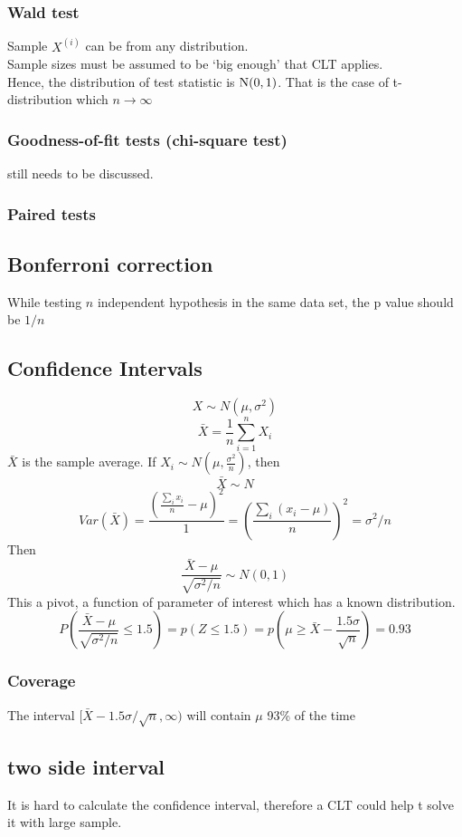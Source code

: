 \documentclass[12pt,a4paper]{article}
\begin{document}
\subsubsection*{Wald test}
Sample $X^{(i)}$ can be from any distribution.\\
Sample sizes must be assumed to be `big enough' that CLT applies.\\
Hence, the distribution of test statistic is $\rm N(0,1)$. That is the case of t-distribution which $n \rightarrow \infty$
\subsubsection*{Goodness-of-fit tests (chi-square test)}
still needs to be discussed.
\subsubsection*{Paired tests}
\subsection*{Bonferroni correction}
While testing $n$ independent hypothesis in the same data set, the p value should be $1/n$

\subsection*{Confidence Intervals}
$$
X \sim N(\mu,\sigma^2)
$$
$$
\bar X = \frac{1}{n}\sum_{i=1}^{n}X_i
$$
$\bar X$ is the sample average. If $X_i \sim N(\mu,\frac{\sigma^2}{n})$, then
$$
\bar X \sim N
$$
$$
Var(\bar X) = \frac{(\frac{\sum_ix_i}{n}-\mu)^2}{1}=(\frac{\sum_i(x_i-\mu)}{n})^2=\sigma^2/n 
$$Then
$$
\frac{\bar X-\mu}{\sqrt{\sigma^2/n}} \sim N(0,1)
$$
This a pivot, a function of parameter of interest which has a known distribution.\\
$$
P\left(\frac{\bar X-\mu}{\sqrt{\sigma^2/n}}\le 1.5\right) = p(Z\le 1.5)=p\left(\mu\ge \bar X-\frac{1.5\sigma}{\sqrt n}\right) = 0.93
$$
\subsubsection*{Coverage}
The interval $[\bar X-1.5\sigma/\sqrt n,\infty)$ will contain $\mu$ 93\% of the time
\subsection*{two side interval}
It is hard to calculate the confidence interval, therefore a CLT could help t solve it with large sample.
\end{document}
